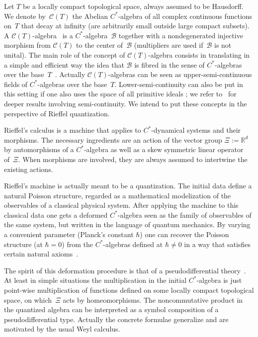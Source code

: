 \documentclass[pdftex]{sigma}
\def\C{\mathcal{C}}
\def\B{{\mathcal B}}
\begin{document}
Let $T$ be a locally compact topological space, always assumed to be Hausdorf\/f. We denote by~$\C(T)$ the Abelian $C^*$-algebra
of  all complex continuous functions on~$T$ that decay at inf\/inity (are arbitrarily small outside large compact subsets).
A $\C(T)$-algebra~\cite{Bl,Ni,Wi} is a $C^*$-algebra~$\B$ together with a nondegenerated injective morphism from $\C(T)$ to
the center of~$\B$ (multipliers are used if~$\B$ is not unital).
The main role of the
concept of $\C(T)$-algebra consists in translating in a simple and ef\/f\/icient way the idea that $\B$ is f\/ibred in the sense of
$C^*$-algebras over the base~$T$~\cite{Fe,To1}.
Actually $\C(T)$-algebras can be seen as upper-semi-continuous f\/ields of $C^*$-algebras over the base~$T$.
Lower-semi-continuity can also be put in this setting if one also uses the space of all primitive ideals \cite{Lee,Ni,RW,Rie2,Wi};
we refer to~\cite{Bl2} for deeper results involving semi-continuity.
We intend to put these concepts in the perspective of Rief\/fel quantization.

Rief\/fel's calculus \cite{Rie1,Rie2} is a machine that applies to $C^*$-dynamical systems and their morphisms.
The necessary ingredients are an action of the vector group $\Xi:=\mathbb R^d$ by automorphisms of a $C^*$-algebra as well
as a skew symmetric linear operator of~$\Xi$.
When morphisms are involved, they are always assumed to intertwine the existing actions.

Rief\/fel's machine is actually meant to be a quantization.
The initial data def\/ine a natural Poisson structure,
regarded as a mathematical modelization of the observables of a classical physical system.
After applying the machine to this classical data one gets a deformed $C^*$-algebra seen as the family of observables of the same system,
but written in the language of quantum mechanics. By varying a convenient parameter (Planck's constant $\hbar$)
one can recover the Poisson structure (at $\hbar=0$) from the $C^*$-algebras def\/ined at $\hbar\ne0$ in a way that satisf\/ies
certain natural axioms~\cite{La,Rie1,Rie2}.

The spirit of this deformation procedure is that of a pseudodif\/ferential
theory~\cite{Fol89}. At least in simple situations the multiplication in the initial $C^*$-algebra is just point-wise multiplication
of functions def\/ined on some locally compact topological space, on which~$\Xi$ acts by homeomorphisms.
The noncommutative product in the quantized algebra can be interpreted as a symbol composition of a pseudodif\/ferential type.
Actually the concrete formulae generalize and are motivated by the usual Weyl calculus.
\end{document}
